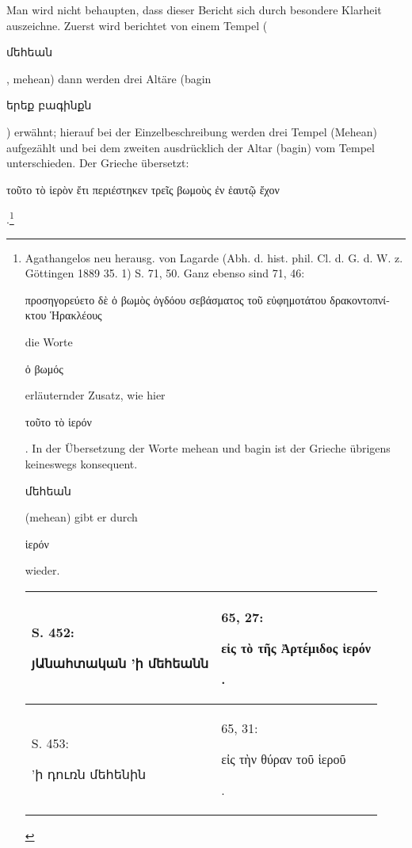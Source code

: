 \documentclass{article}
\begin{document}
Man wird nicht behaupten, dass dieser Bericht sich durch besondere Klarheit auszeichne. Zuerst wird berichtet von einem Tempel (\begin{armenian}մեհեան\end{armenian}, mehean) dann werden drei Altäre (bagin \begin{armenian}երեք բագինքն\end{armenian}) erwähnt; hierauf bei der Einzelbeschreibung werden drei Tempel (Mehean) aufgezählt und bei dem zweiten ausdrücklich der Altar (bagin) vom Tempel unterschieden. Der Grieche übersetzt: \begin{greek}τοῦτο τὸ ἱερὸν ἔτι περιέστηκεν τρεῖς βωμοὺς ἐν ἑαυτῷ ἔχον\end{greek}.\footnote{Agathangelos neu herausg. von Lagarde (Abh. d. hist. phil. Cl. d. G. d. W. z. Göttingen 1889 35. 1) S. 71, 50. Ganz ebenso sind 71, 46: \begin{greek}προσηγορεύετο δὲ ὁ βωμὸς ὀγδόου σεβάσματος τοῦ εὐφημοτάτου δρακοντοπνίκτου Ἡρακλέους\end{greek} die Worte \begin{greek}ὁ βωμός\end{greek} erläuternder Zusatz, wie hier \begin{greek}τοῦτο τὸ ἱερόν\end{greek}. In der Übersetzung der Worte mehean und bagin ist der Grieche übrigens keineswegs konsequent. \begin{armenian}մեհեան\end{armenian} (mehean) gibt er durch \begin{greek}ἱερόν\end{greek} wieder.\hspace*{5mm}\begin{table}[H]
    \centering
    \tiny
    \begin{tabular}{p{45mm}|p{45mm}}
    \hline
        S. 452: \begin{armenian}յԱնահտական  'ի մեհեանն\end{armenian} & 65, 27: \begin{greek}εἰς τὸ τῆς Ἀρτέμιδος ἱερόν\end{greek}.   \\ \hline
        S. 453: \begin{armenian}'ի դուռն մեհենին\end{armenian} & 65, 31: \begin{greek}εἰς τὴν θύραν τοῦ ἱεροῦ\end{greek}.   \\ \hline

\end{tabular}
\end{table}}
\end{document}
